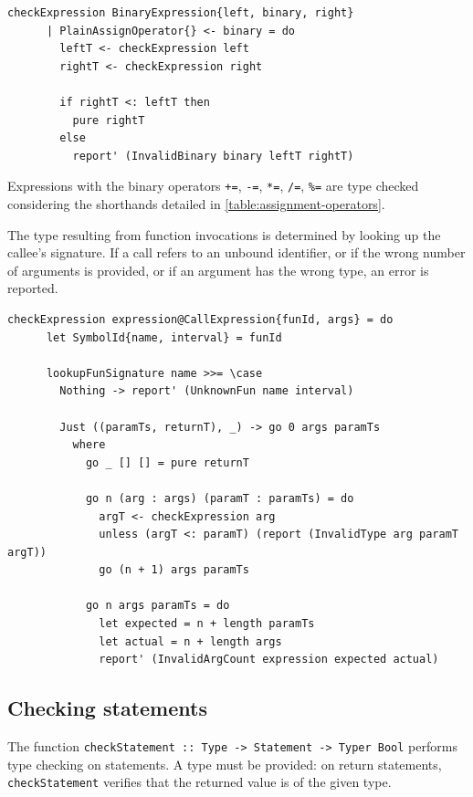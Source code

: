 \documentclass[UdineBachThesis,american,11pt]{PhdThesis}
\begin{document}
  \begin{Verbatim}[gobble=4,fontsize=\small]
    checkExpression BinaryExpression{left, binary, right}
      | PlainAssignOperator{} <- binary = do
        leftT <- checkExpression left
        rightT <- checkExpression right

        if rightT <: leftT then
          pure rightT
        else
          report' (InvalidBinary binary leftT rightT)
  \end{Verbatim}

  Expressions with the binary operators \mbox{\texttt{+=}}, \mbox{\texttt{-=}},
  \mbox{\texttt{*=}}, \mbox{\texttt{/=}}, \mbox{\texttt{\%=}} are type checked
  considering the shorthands detailed in \autoref{table:assignment-operators}.

  The type resulting from function invocations is determined by looking up the
  callee's signature. If a call refers to an unbound identifier, or if the wrong
  number of arguments is provided, or if an argument has the wrong type, an
  error is reported.

  \begin{Verbatim}[gobble=4,fontsize=\small]
    checkExpression expression@CallExpression{funId, args} = do
      let SymbolId{name, interval} = funId

      lookupFunSignature name >>= \case
        Nothing -> report' (UnknownFun name interval)

        Just ((paramTs, returnT), _) -> go 0 args paramTs
          where
            go _ [] [] = pure returnT

            go n (arg : args) (paramT : paramTs) = do
              argT <- checkExpression arg
              unless (argT <: paramT) (report (InvalidType arg paramT argT))
              go (n + 1) args paramTs

            go n args paramTs = do
              let expected = n + length paramTs
              let actual = n + length args
              report' (InvalidArgCount expression expected actual)
  \end{Verbatim}

  \subsection{Checking statements}

  The function \mbox{\texttt{checkStatement :: Type -> Statement -> Typer Bool}}
  performs type \linebreak checking on statements. A type must be provided: on
  return statements, \mbox{\texttt{checkStatement}}  verifies that the returned
  value is of the given type.
\end{document}
